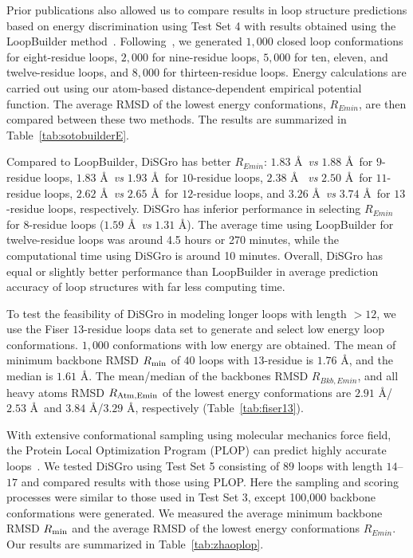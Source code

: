Prior publications also allowed us to compare results in loop
structure predictions based on energy discrimination using Test Set
4 with results obtained using  the LoopBuilder
method~\cite{soto2008}. Following~\cite{soto2008},
 we generated $1,000$ closed loop conformations for
eight-residue loops, $2,000$ for nine-residue loops, $5,000$ for
ten, eleven, and twelve-residue loops, and $8,000$ for
thirteen-residue loops. Energy calculations are carried out using
our atom-based distance-dependent empirical potential function. The
average RMSD of the lowest energy conformations, $R_{Emin}$, are
then compared between these two methods. The results are summarized
in Table~\ref{tab:sotobuilderE}.

Compared to LoopBuilder, {\sc DiSGro} has better $R_{Emin}$: $1.83$
\r{A}\ {\it vs}\/ $1.88$ \r{A}\ for $9$-residue loops, $1.83$ \r{A}\
{\it vs}\/ $1.93$ \r{A}\ for $10$-residue loops, $2.38$ \r{A}\ {\it
vs}\/ $2.50$ \r{A}\ for $11$-residue loops, $2.62$ \r{A}\ {\it vs}\/
$2.65$ \r{A}\ for $12$-residue loops, and $3.26$ \r{A}\ {\it vs}\/
$3.74$ \r{A}\ for $13$-residue loops, respectively. {\sc DiSGro} has
inferior performance in selecting $R_{Emin}$ for $8$-residue loops
($1.59$ \r{A}\ {\it vs}\/ $1.31$ \r{A}). The average time using
LoopBuilder for twelve-residue loops was around 4.5 hours or 270
minutes, while the computational time using {\sc DiSGro} is around
10 minutes. Overall, {\sc DiSGro} has equal or slightly better
performance than LoopBuilder in average prediction accuracy of loop
structures with far less computing time.

To test the feasibility of {\sc DiSGro} in modeling longer loops
with length $>12$, we use the Fiser $13$-residue loops data set to
generate and select low energy loop conformations. $1,000$
conformations with low energy are obtained. The mean of minimum
backbone RMSD $R_{\rm min}$ of $40$ loops with $13$-residue is
$1.76$ \r{A}, and the median is $1.61$ \r{A}. The mean/median of the
backbones RMSD $R_{Bkb,Emin}$, and all heavy atoms RMSD $R_{\rm
Atm,Emin}$ of the lowest energy conformations are $2.91$
\r{A}/$2.53$ \r{A}\ and $3.84$ \r{A}/$3.29$ \r{A}, respectively
(Table~\ref{tab:fiser13}).

With extensive conformational sampling using molecular mechanics
force field, the Protein Local Optimization Program (PLOP) can
predict highly accurate loops~\cite{jacobson2004,zhu2006,zhao2011}.
We tested {\sc DiSGro} using Test Set 5 consisting of $89$ loops
with length $14$--$17$ and compared results with those using PLOP.
Here the sampling and scoring processes were similar to those used
in Test Set 3, except 100,000 backbone conformations were generated.
We measured the average minimum backbone RMSD $R_{\rm min}$ and the
average RMSD of the lowest energy conformations $R_{Emin}$. Our
results are summarized in Table~\ref{tab:zhaoplop}.

